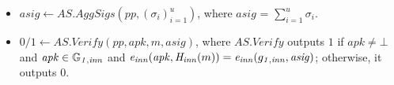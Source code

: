 \begin{construction}
\begin{itemize}
\item $\mathit{asig} \leftarrow \mathit{AS.AggSigs}(\mathit{pp}, (\sigma_i)_{i=1}^u)$, where $\mathit{asig}$ = $\sum_{i=1}^{u} \sigma_i$.  

\item $0/1 \leftarrow  \mathit{AS.Verify}(\mathit{pp}, \mathit{apk}, m, \mathit{asig})$, where $\mathit{AS.Verify}$ outputs $1$ if $\mathit{apk} \neq \bot$ and
$\mathit{apk} \in \mathbb{G}_{\mathit{1,inn}}$ and $\mathit{e}_{\mathit{inn}}(\mathit{apk}, \mathit{H}_{\mathit{inn}}(m)) = \mathit{e}_{\mathit{inn}}(g_{\mathit{1,inn}}, \mathit{asig})$; otherwise, it outputs $0$.
\end{itemize}
\end{construction}